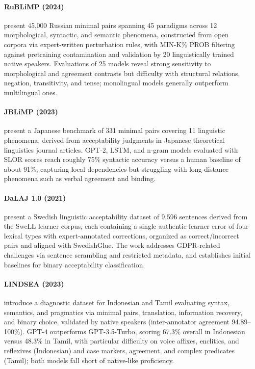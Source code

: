 \documentclass[letterpaper]{article}
\begin{document}
\paragraph{RuBLiMP (2024)} \citet{taktasheva-etal-2024-rublimp} present 45,000 Russian minimal pairs spanning 45 paradigms across 12 morphological, syntactic, and semantic phenomena, constructed from open corpora via expert-written perturbation rules, with MIN-K\% PROB filtering against pretraining contamination and validation by 20 linguistically trained native speakers. Evaluations of 25 models reveal strong sensitivity to morphological and agreement contrasts but difficulty with structural relations, negation, transitivity, and tense; monolingual models generally outperform multilingual ones.

\paragraph{JBLiMP (2023)} \citet{someya-oseki-2023-jblimp} present a Japanese benchmark of 331 minimal pairs covering 11 linguistic phenomena, derived from acceptability judgments in Japanese theoretical linguistics journal articles. GPT-2, LSTM, and n-gram models evaluated with SLOR scores reach roughly 75\% syntactic accuracy versus a human baseline of about 91\%, capturing local dependencies but struggling with long-distance phenomena such as verbal agreement and binding.

\paragraph{DaLAJ 1.0 (2021)} \citet{volodina-etal-2021-dalaj} present a Swedish linguistic acceptability dataset of 9,596 sentences derived from the SweLL learner corpus, each containing a single authentic learner error of four lexical types with expert-annotated corrections, organized as correct/incorrect pairs and aligned with SwedishGlue. The work addresses GDPR-related challenges via sentence scrambling and restricted metadata, and establishes initial baselines for binary acceptability classification.

\paragraph{LINDSEA (2023)} \citet{leong2023bhasaholisticsoutheastasian} introduce a diagnostic dataset for Indonesian and Tamil evaluating syntax, semantics, and pragmatics via minimal pairs, translation, information recovery, and binary choice, validated by native speakers (inter-annotator agreement 94.89--100\%). GPT-4 outperforms GPT-3.5-Turbo, scoring 67.3\% overall in Indonesian versus 48.3\% in Tamil, with particular difficulty on voice affixes, enclitics, and reflexives (Indonesian) and case markers, agreement, and complex predicates (Tamil); both models fall short of native-like proficiency.
\end{document}
